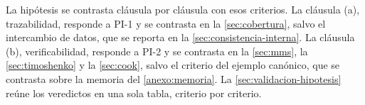 La hipótesis se contrasta cláusula por cláusula con esos criterios. La cláusula (a), trazabilidad, responde a PI-1 y se contrasta en la \autoref{sec:cobertura}, salvo el intercambio de datos, que se reporta en la \autoref{sec:consistencia-interna}. La cláusula (b), verificabilidad, responde a PI-2 y se contrasta en la \autoref{sec:mms}, la \autoref{sec:timoshenko} y la \autoref{sec:cook}, salvo el criterio del ejemplo canónico, que se contrasta sobre la memoria del \autoref{anexo:memoria}. La \autoref{sec:validacion-hipotesis} reúne los veredictos en una sola tabla, criterio por criterio.
